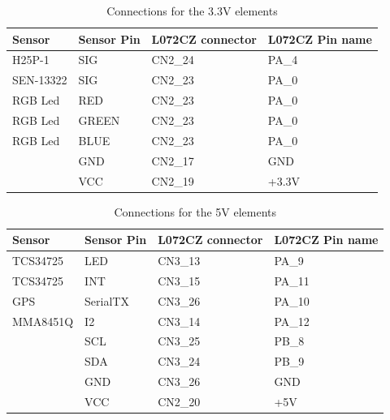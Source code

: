 \begin{table}[H]
    \begin{center}
        \begin{tabular}{|p{} | p{} | p{}| p{}|}
            \hline
            \textbf{Sensor} & \textbf{Sensor Pin} & \textbf{L072CZ connector} & \textbf{L072CZ Pin name}\\
            \hline
            H25P-1 & SIG & CN2\_24 & PA\_4 \\
            \hline
            SEN-13322 & SIG & CN2\_23 & PA\_0 \\
            \hline
            RGB Led & RED & CN2\_23 & PA\_0 \\%
            \hline
            RGB Led & GREEN & CN2\_23 & PA\_0 \\
            \hline
            RGB Led & BLUE & CN2\_23 & PA\_0 \\
            \hline
             & GND & CN2\_17 & GND \\
            \hline
             & VCC & CN2\_19 & +3.3V \\
            \hline
        \end{tabular}
    \end{center}
    \caption{Connections for the 3.3V elements}
    \label{Connections3}
\end{table}
\begin{table}[H]
    \begin{center}
        \begin{tabular}{|p{} | p{} | p{}| p{}|}
            \hline
            \textbf{Sensor} & \textbf{Sensor Pin} & \textbf{L072CZ connector} & \textbf{L072CZ Pin name}\\
            \hline
            TCS34725 & LED & CN3\_13 & PA\_9 \\
            \hline
            TCS34725 & INT & CN3\_15 & PA\_11 \\
            \hline
            GPS & SerialTX & CN3\_26 & PA\_10 \\
            \hline
            MMA8451Q & I2 & CN3\_14 & PA\_12 \\
            \hline
             & SCL & CN3\_25 & PB\_8 \\
            \hline
             & SDA & CN3\_24 & PB\_9 \\
            \hline
             & GND & CN3\_26 & GND \\
            \hline
             & VCC & CN2\_20 & +5V \\
            \hline
        \end{tabular} 
    \end{center}
    \caption{Connections for the 5V elements}
    \label{Connections5}
\end{table}

